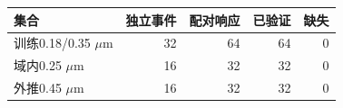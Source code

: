 \begin{tabular}{lrrrr}
\toprule
集合 & 独立事件 & 配对响应 & 已验证 & 缺失\\
\midrule
训练0.18/0.35 $\mu$m & 32 & 64 & 64 & 0\\
域内0.25 $\mu$m & 16 & 32 & 32 & 0\\
外推0.45 $\mu$m & 16 & 32 & 32 & 0\\
\bottomrule
\end{tabular}

